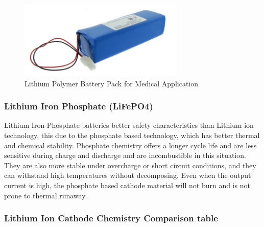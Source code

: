 \documentclass[report.tex]{subfiles}
\begin{document}
\begin{figure}[H]
	\centering
	\includegraphics[width=0.7\textwidth]{Include/Figure/Hardware/lithium-polymer-battery-pack.jpg}
	\caption{Lithium Polymer Battery Pack for Medical Application\cite{litBatTech}}
	\label{fig:lithpopack}
\end{figure}

\subsubsection{Lithium Iron Phosphate (LiFePO4)\cite{litBatTech}}
Lithium Iron Phosphate batteries better safety characteristics than Lithium-ion technology, this due to the phosphate based technology, which has better thermal and chemical stability. Phosphate chemistry offers a longer cycle life and are less sensitive during charge and discharge and are incombustible in this situation. They are also more stable under overcharge or short circuit conditions, and they can withstand high temperatures without decomposing. Even when the output current is high, the phosphate based cathode material will not burn and is not prone to thermal runaway.

\subsubsection{Lithium Ion Cathode Chemistry Comparison table}
\end{document}
